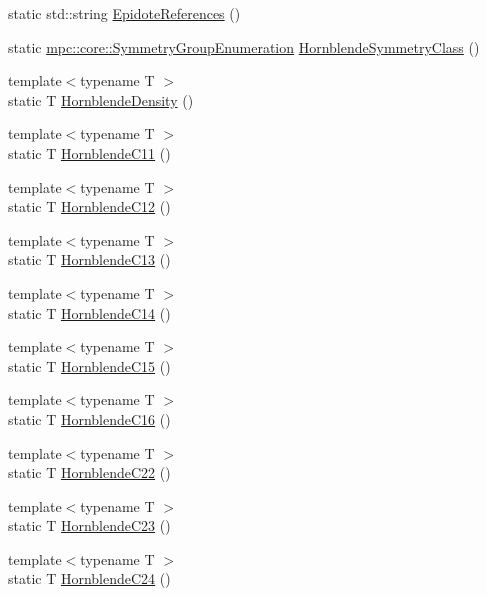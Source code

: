 \begin{DoxyCompactItemize}
static std\+::string \mbox{\hyperlink{namespacempc_1_1data_a193b7ddaf1c44726ac3725cca9cc3791}{Epidote\+References}} ()
\item 
static \mbox{\hyperlink{namespacempc_1_1core_a9d979684062547055a0ef5c13077bad8}{mpc\+::core\+::\+Symmetry\+Group\+Enumeration}} \mbox{\hyperlink{namespacempc_1_1data_acb272655c645b361b58acd092cb0362f}{Hornblende\+Symmetry\+Class}} ()
\item 
{\footnotesize template$<$typename T $>$ }\\static T \mbox{\hyperlink{namespacempc_1_1data_a0b3ecc2ae8fd3effec8046a84a852da7}{Hornblende\+Density}} ()
\item 
{\footnotesize template$<$typename T $>$ }\\static T \mbox{\hyperlink{namespacempc_1_1data_a677609d3f66c51292db378a5abbba3e1}{Hornblende\+C11}} ()
\item 
{\footnotesize template$<$typename T $>$ }\\static T \mbox{\hyperlink{namespacempc_1_1data_afa7c10ac7c2225e827b8a63413e06f53}{Hornblende\+C12}} ()
\item 
{\footnotesize template$<$typename T $>$ }\\static T \mbox{\hyperlink{namespacempc_1_1data_a55fdd151be94a96ade5cbb7acae92a75}{Hornblende\+C13}} ()
\item 
{\footnotesize template$<$typename T $>$ }\\static T \mbox{\hyperlink{namespacempc_1_1data_abecf15ecd895997f681e0651de7a662c}{Hornblende\+C14}} ()
\item 
{\footnotesize template$<$typename T $>$ }\\static T \mbox{\hyperlink{namespacempc_1_1data_aaeeb354c630ab65b130e13d60dd76cfb}{Hornblende\+C15}} ()
\item 
{\footnotesize template$<$typename T $>$ }\\static T \mbox{\hyperlink{namespacempc_1_1data_a08677cb0d405354a51f2e08572e9cad6}{Hornblende\+C16}} ()
\item 
{\footnotesize template$<$typename T $>$ }\\static T \mbox{\hyperlink{namespacempc_1_1data_ad6d385e755bc529d6357515c8d357ee2}{Hornblende\+C22}} ()
\item 
{\footnotesize template$<$typename T $>$ }\\static T \mbox{\hyperlink{namespacempc_1_1data_a9b42f9362bf0b8bddc93f6911b0e717b}{Hornblende\+C23}} ()
\item 
{\footnotesize template$<$typename T $>$ }\\static T \mbox{\hyperlink{namespacempc_1_1data_a455bfb677c7c7e290247dd48908ab017}{Hornblende\+C24}} ()

\end{DoxyCompactItemize}
